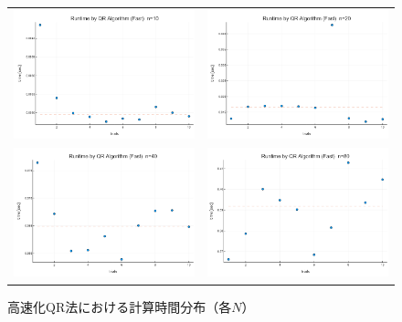 \documentclass[a4paper,11pt]{ltjsarticle}
\begin{document}
\begin{figure}[H]
  \centering
  \begin{tabular}{cc}
    \includegraphics[width=72mm]{graphs/exp6_n10_time.png} &
    \includegraphics[width=72mm]{graphs/exp6_n20_time.png} \\
    \includegraphics[width=72mm]{graphs/exp6_n40_time.png} &
    \includegraphics[width=72mm]{graphs/exp6_n80_time.png} \\
  \end{tabular}
  \caption{高速化QR法における計算時間分布（各$N$）}
  \label{fig:exp6_times}
\end{figure}
\end{document}
